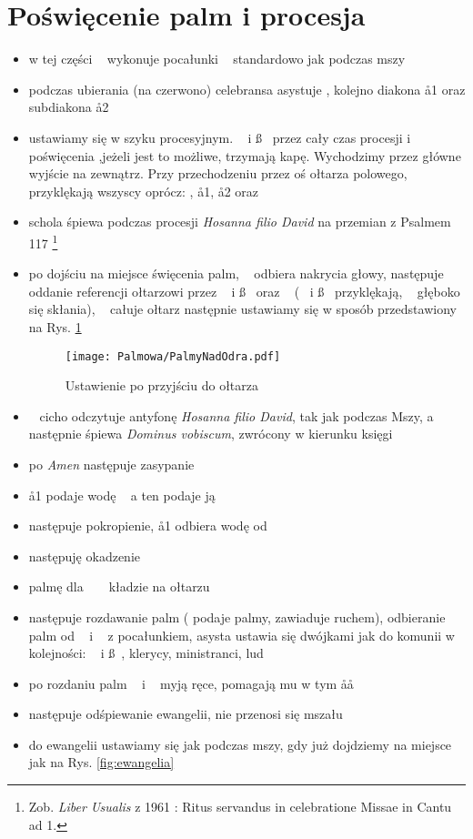 \section{Poświęcenie palm i procesja}

\begin{itemize}
	\item w tej części \dd~ wykonuje pocałunki \ii~ standardowo jak podczas mszy
	\item podczas ubierania (na {\color{red} czerwono}) celebransa asystuje \cc,
	      kolejno diakona \aa1 oraz subdiakona \aa2
	\item ustawiamy się w szyku procesyjnym. \dd~ i \ss~ przez cały czas
	      procesji i poświęcenia ,jeżeli jest to możliwe, trzymają kapę.
	      Wychodzimy przez główne wyjście na zewnątrz. Przy przechodzeniu przez
	      oś ołtarza polowego, przyklękają wszyscy oprócz: , \aa1, \aa2
	      oraz \ii
	\item schola śpiewa podczas procesji \textit{Hosanna filio David} na
	      przemian z Psalmem 117 \footnote{Zob. \textit{Liber Usualis} z 1961 :
		      Ritus servandus in celebratione Missae in Cantu ad 1.}
	\item po dojściu na miejsce święcenia palm, \cc~ odbiera nakrycia głowy,
	      następuje  oddanie referencji ołtarzowi przez \dd~ i \ss~ oraz \ii~
	      (\dd~ i \ss~ przyklękają, \ii~ głęboko się skłania), \ii~ całuje
	      ołtarz następnie ustawiamy się w sposób przedstawiony na Rys.
	      \ref{fig:przyjscie}

	      \begin{figure}[h]
		      \centering
		      \texttt{[image: Palmowa/PalmyNadOdra.pdf]}
		      \caption{Ustawienie po przyjściu do ołtarza}
		      \label{fig:przyjscie}
	      \end{figure}

	\item \ii~ cicho odczytuje antyfonę \textit{Hosanna filio David}, tak jak
	      podczas Mszy, a następnie śpiewa \textit{Dominus vobiscum}, zwrócony w
	      kierunku księgi
	\item po \textit{Amen} następuje zasypanie
	\item \aa1 podaje wodę \cc~ a ten podaje ją \dd
	\item następuje pokropienie, \aa1 odbiera wodę od \dd
	\item następuję okadzenie
	\item palmę dla \ii~ \dd~ kładzie na ołtarzu
	\item następuje rozdawanie palm ( podaje palmy,  zawiaduje ruchem),
	      odbieranie palm od \ii~ i \dd~ z pocałunkiem, asysta ustawia się
	      dwójkami jak do komunii w kolejności: \dd~ i \ss~, klerycy,
	      ministranci, lud
	\item po rozdaniu palm \ii~ i \dd~ myją ręce, pomagają mu w tym \aa\aa
	\item następuje odśpiewanie ewangelii, nie przenosi się mszału
	\item do ewangelii ustawiamy się jak podczas mszy, gdy już dojdziemy na
	      miejsce jak na Rys. \ref{fig:ewangelia}


\end{itemize}
